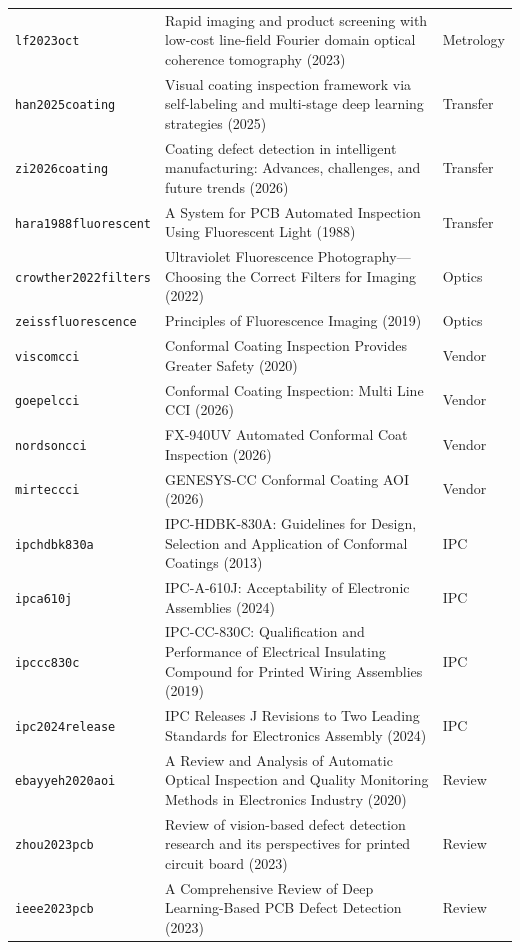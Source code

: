 \begin{longtable}{>{\raggedright\arraybackslash}p{}>{\raggedright\arraybackslash}p{}>{\raggedright\arraybackslash}p{}}
\texttt{lf2023oct} & Rapid imaging and product screening with low-cost line-field Fourier domain optical coherence tomography (2023) & Metrology \\
\texttt{han2025coating} & Visual coating inspection framework via self-labeling and multi-stage deep learning strategies (2025) & Transfer \\
\texttt{zi2026coating} & Coating defect detection in intelligent manufacturing: Advances, challenges, and future trends (2026) & Transfer \\
\texttt{hara1988fluorescent} & A System for PCB Automated Inspection Using Fluorescent Light (1988) & Transfer \\
\texttt{crowther2022filters} & Ultraviolet Fluorescence Photography---Choosing the Correct Filters for Imaging (2022) & Optics \\
\texttt{zeissfluorescence} & Principles of Fluorescence Imaging (2019) & Optics \\
\texttt{viscomcci} & Conformal Coating Inspection Provides Greater Safety (2020) & Vendor \\
\texttt{goepelcci} & Conformal Coating Inspection: Multi Line CCI (2026) & Vendor \\
\texttt{nordsoncci} & FX-940UV Automated Conformal Coat Inspection (2026) & Vendor \\
\texttt{mirteccci} & GENESYS-CC Conformal Coating AOI (2026) & Vendor \\
\texttt{ipchdbk830a} & IPC-HDBK-830A: Guidelines for Design, Selection and Application of Conformal Coatings (2013) & IPC \\
\texttt{ipca610j} & IPC-A-610J: Acceptability of Electronic Assemblies (2024) & IPC \\
\texttt{ipccc830c} & IPC-CC-830C: Qualification and Performance of Electrical Insulating Compound for Printed Wiring Assemblies (2019) & IPC \\
\texttt{ipc2024release} & IPC Releases J Revisions to Two Leading Standards for Electronics Assembly (2024) & IPC \\
\texttt{ebayyeh2020aoi} & A Review and Analysis of Automatic Optical Inspection and Quality Monitoring Methods in Electronics Industry (2020) & Review \\
\texttt{zhou2023pcb} & Review of vision-based defect detection research and its perspectives for printed circuit board (2023) & Review \\
\texttt{ieee2023pcb} & A Comprehensive Review of Deep Learning-Based PCB Defect Detection (2023) & Review \\

\end{longtable}
